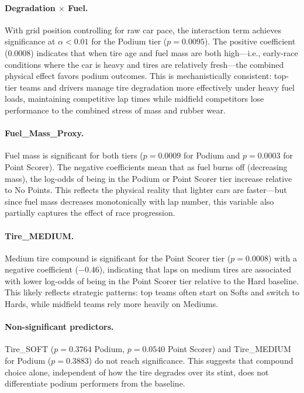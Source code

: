 \paragraph{Degradation $\times$ Fuel.}
With grid position controlling for raw car pace, the interaction term achieves
significance at $\alpha < 0.01$ for the Podium tier ($p = 0.0095$). The positive coefficient
(0.0008) indicates that when tire age and fuel mass are both high---i.e.,
early-race conditions where the car is heavy and tires are relatively
fresh---the combined physical effect favors podium outcomes. This is
mechanistically consistent: top-tier teams and drivers manage tire degradation
more effectively under heavy fuel loads, maintaining competitive lap times
while midfield competitors lose performance to the combined stress of mass
and rubber wear.

\paragraph{Fuel\_Mass\_Proxy.}
Fuel mass is significant for both tiers ($p = 0.0009$ for Podium and $p = 0.0003$ for Point Scorer). The negative coefficients mean that
as fuel burns off (decreasing mass), the log-odds of being in the Podium or
Point Scorer tier increase relative to No Points. This reflects the physical
reality that lighter cars are faster---but since fuel mass decreases
monotonically with lap number, this variable also partially captures the
effect of race progression.

\paragraph{Tire\_MEDIUM.}
Medium tire compound is significant for the Point Scorer tier ($p = 0.0008$) with a negative
coefficient ($-0.46$), indicating that laps on medium tires are associated
with lower log-odds of being in the Point Scorer tier relative to the Hard
baseline. This likely reflects strategic patterns: top teams often start on
Softs and switch to Hards, while midfield teams rely more heavily on Mediums.

\paragraph{Non-significant predictors.}
Tire\_SOFT ($p = 0.3764$ Podium, $p = 0.0540$ Point Scorer) and
Tire\_MEDIUM for Podium ($p = 0.3883$) do not reach significance. This
suggests that compound choice alone, independent of how the tire degrades
over its stint, does not differentiate podium performers from the baseline.

